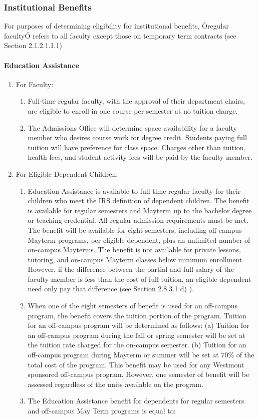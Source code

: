 \documentclass[letterpaper, 11pt]{article}
\begin{document}
		\subsubsection{Institutional Benefits}
			For purposes of determining eligibility for institutional benefits, Òregular facultyÓ refers to all faculty except those on temporary term contracts (see Section 2.1.2.1.1.1)
			\paragraph{Education Assistance}
				\begin{enumerate}[label=\alph*)]
					\item{For Faculty:
						\begin{enumerate}[label=\arabic*)]
							\item{Full-time regular faculty, with the approval of their department chairs, are eligible to enroll in one course per semester at no tuition charge.}
							\item{The Admissions Office will determine space availability for a faculty member who desires course work for degree credit.  Students paying full tuition will have preference for class space.  Charges other than tuition, health fees, and student activity fees will be paid by the faculty member.}
						\end{enumerate}
					}
					\item{For Eligible Dependent Children:
						\begin{enumerate}[label=\arabic*)]
							\item{Education Assistance is available to full-time regular faculty for their children who meet the IRS definition of dependent children.  The benefit is available for regular semesters and Mayterm up to the bachelor degree or teaching credential. All regular admission requirements must be met.  The benefit will be available for eight semesters, including off-campus Mayterm programs, per eligible dependent, plus an unlimited number of on-campus Mayterms.  The benefit is not available for private lessons, tutoring, and on-campus Mayterm classes below minimum enrollment.  However, if the difference between the partial and full salary of the faculty member is less than the cost of full tuition, an eligible dependent need only pay that difference (see Section 2.8.3.1 d) ).}
							\item{When one of the eight semesters of benefit is used for an off-campus program, the benefit covers the tuition portion of the program.  Tuition for an off-campus program will be determined as follows:}
							(a) Tuition for an off-campus program during the fall or spring semester will be set at the tuition rate charged for the on-campus semester.
							(b) Tuition for an off-campus program during Mayterm or summer will be set at 70\% of the total cost of the program.  This benefit may be used for any Westmont sponsored off-campus program.  However, one semester of benefit will be assessed regardless of the units available on the program.
							\item{The Education Assistance benefit for dependents for regular semesters and off-campus May Term programs is equal to:}


\end{enumerate}}
\end{enumerate}
\end{document}
